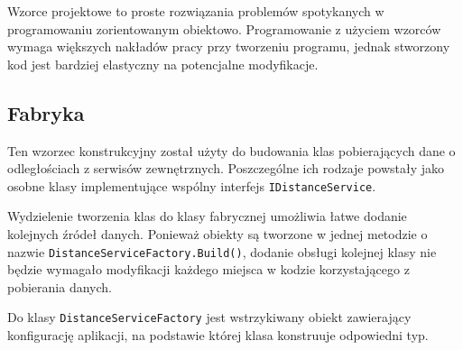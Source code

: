 Wzorce projektowe to proste rozwiązania problemów spotykanych w programowaniu zorientowanym obiektowo\cite{wzorce}. Programowanie z użyciem wzorców wymaga większych nakładów pracy przy tworzeniu programu, jednak stworzony kod jest bardziej elastyczny na potencjalne modyfikacje.

\subsection*{Fabryka}
Ten wzorzec konstrukcyjny został użyty do budowania klas pobierających dane o odległościach z serwisów zewnętrznych. Poszczególne ich rodzaje powstały jako osobne klasy implementujące wspólny interfejs \texttt{IDistanceService}.

Wydzielenie tworzenia klas do klasy fabrycznej umożliwia łatwe dodanie kolejnych źródeł danych. Ponieważ obiekty są tworzone w jednej metodzie o nazwie \texttt{DistanceServiceFactory.Build()}, dodanie obsługi kolejnej klasy nie będzie wymagało modyfikacji każdego miejsca w kodzie korzystającego z pobierania danych.

Do klasy \texttt{DistanceServiceFactory} jest wstrzykiwany obiekt zawierający konfigurację aplikacji, na podstawie której klasa konstruuje odpowiedni typ.

